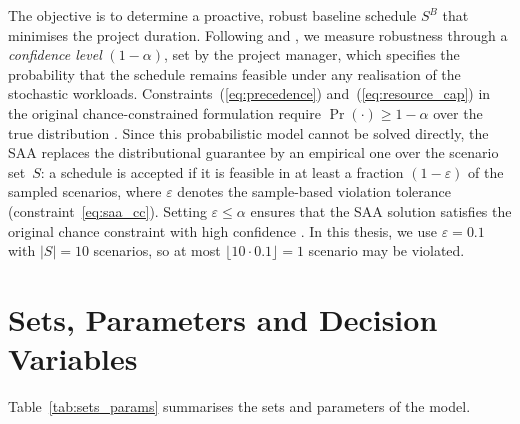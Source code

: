 The objective is to determine a proactive, robust baseline
schedule $S^B$ that minimises the project duration. Following
\textcite{Lamas2016} and \textcite{MendlRieck2024}, we measure robustness through a
\emph{confidence level} $(1 - \alpha)$, set by the project
manager, which specifies the probability that the schedule remains
feasible under any realisation of the stochastic workloads.
Constraints~(\ref{eq:precedence}) and~(\ref{eq:resource_cap})
in the original chance-constrained formulation require
$\Pr(\cdot) \geq 1 - \alpha$ over the true distribution
\parencite{Lamas2016}. Since this probabilistic model cannot
be solved directly, the SAA replaces the distributional guarantee
by an empirical one over the scenario set~$S$: a schedule is
accepted if it is feasible in at least a fraction
$(1 - \varepsilon)$ of the sampled scenarios, where
$\varepsilon$ denotes the sample-based violation tolerance
(constraint~\ref{eq:saa_cc}). Setting
$\varepsilon \leq \alpha$ ensures that the SAA solution satisfies
the original chance constraint with high confidence
\parencite{Lamas2016}. In this thesis, we use
$\varepsilon = 0.1$ with $|S| = 10$ scenarios, so at most
$\lfloor 10 \cdot 0.1 \rfloor = 1$ scenario may be violated.

\section{Sets, Parameters and Decision Variables}
\label{sec:notation}

Table~\ref{tab:sets_params} summarises the sets and parameters
of the model.

